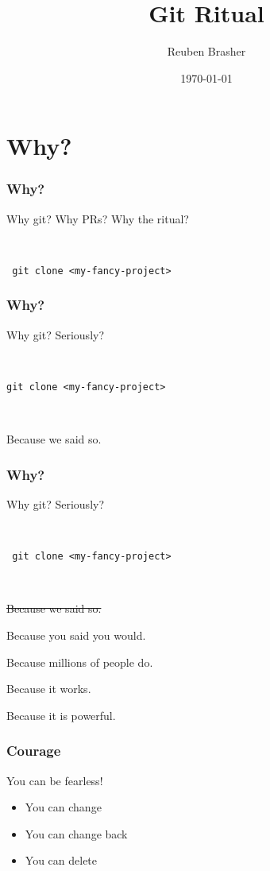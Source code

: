 \documentclass{beamer}
\title{Git Ritual}
\author{Reuben Brasher}
\date{\today}
\begin{document}
\frame{\titlepage}

\section[Outline]{}
\frame{\tableofcontents}

\section{Why?}

\frame
{
   \frametitle{Why?}

    Why git? Why PRs? Why the ritual?

    \

    \texttt{
    git clone <my-fancy-project>
    }

}

\frame
{
   \frametitle{Why?}

    Why git? Seriously?

    \

    \texttt{git clone <my-fancy-project>}

    \

    Because we said so.
}

\frame
{
   \frametitle{Why?}

    Why git? Seriously?

    \

    \texttt{
    git clone <my-fancy-project>
    }

    \

    \sout{Because we said so.}

    Because you said you would.

    Because millions of people do.

    Because it works.

    Because it is powerful.

}

\frame
{
   \frametitle{Courage}

    You can be fearless!

   \begin{itemize}
      \item<1-> You can change

      \item<2-> You can change back

      \item<3-> You can delete

   \end{itemize}

}
\end{document}
